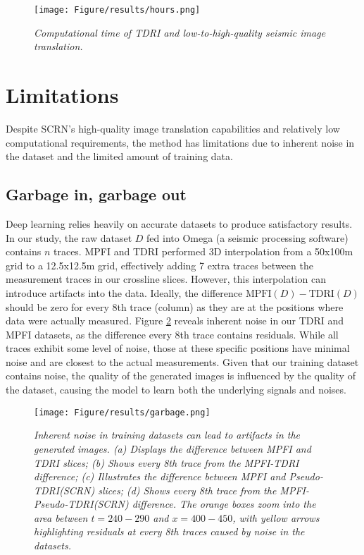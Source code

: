 \begin{figure}[ht]
	\centering
	\texttt{[image: Figure/results/hours.png]} %
	\caption{\textit{Computational time of TDRI and low-to-high-quality seismic image translation. }}
	\label{fig:time}
\end{figure}

\section{Limitations}
Despite SCRN's high-quality image translation capabilities and relatively low computational requirements, the method has limitations due to inherent noise in the dataset and the limited amount of training data.

\subsection{Garbage in, garbage out} \label{subsec:garbage}
Deep learning relies heavily on accurate datasets to produce satisfactory results. In our study, the raw dataset $D$ fed into Omega (a seismic processing software) contains $n$ traces. MPFI and TDRI performed 3D interpolation from a 50x100m grid to a 12.5x12.5m grid, effectively adding 7 extra traces between the measurement traces in our crossline slices. However, this interpolation can introduce artifacts into the data. Ideally, the difference $\text{MPFI}(D) - \text{TDRI}(D)$ should be zero for every 8th trace (column) as they are at the positions where data were actually measured. Figure \ref{fig:garbage} reveals inherent noise in our TDRI and MPFI datasets, as the difference every 8th trace contains residuals. While all traces exhibit some level of noise, those at these specific positions have minimal noise and are closest to the actual measurements. Given that our training dataset contains noise, the quality of the generated images is influenced by the quality of the dataset, causing the model to learn both the underlying signals and noises.

\begin{figure}[h]
	\centering
	\texttt{[image: Figure/results/garbage.png]} %
	\caption{\textit{Inherent noise in training datasets can lead to artifacts in the generated images. (a) Displays the difference between MPFI and TDRI slices; (b) Shows every 8th trace from the MPFI-TDRI difference; (c) Illustrates the difference between MPFI and Pseudo-TDRI(SCRN) slices; (d) Shows every 8th trace from the MPFI-Pseudo-TDRI(SCRN) difference. The orange boxes zoom into the area between $t=240-290$ and $x=400-450$, with yellow arrows highlighting residuals at every 8th traces caused by noise in the datasets.}}
	\label{fig:garbage}
\end{figure}

